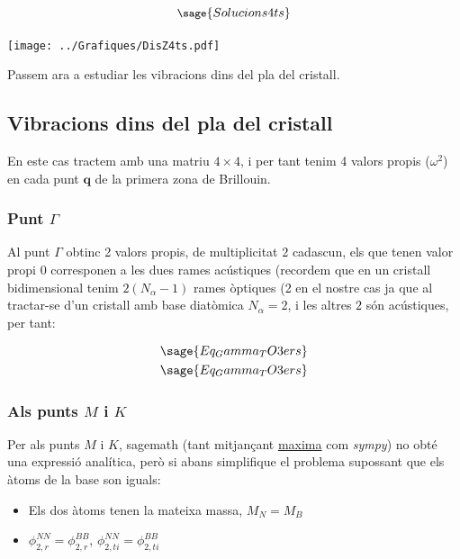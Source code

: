 \documentclass[12pt]{article} %
\let\vec\mathbf %
\begin{document}
{\begin{equation}\small{
 \sage{Solucions4ts}}
\end{equation}

\begin{center}
\texttt{[image: ../Grafiques/DisZ4ts.pdf]}
\end{center}

Passem ara a estudiar les vibracions dins del pla del cristall.

\subsection{Vibracions dins del pla del cristall}

En este cas tractem amb una matriu $4\times 4$, i per tant tenim 4 valors propis ($\omega^2$) en cada punt $\vec q$ de la primera zona de Brillouin.


\subsubsection{Punt $\Gamma$}

Al punt $\Gamma$ obtinc 2 valors propis, de multiplicitat $2$ cadascun, els que tenen valor propi $0$ corresponen a les dues rames acústiques (recordem que en un cristall bidimensional tenim $2(N_\alpha -1)$ rames òptiques (2 en el nostre cas ja que al tractar-se d'un cristall amb base diatòmica $N_\alpha=2$, i les altres $2$ són acústiques, per tant: 

\begin{equation}
 \begin{split}
\sage{Eq_Gamma_TO3ers}\\
\sage{Eq_Gamma_TO3ers}
 \end{split}
\end{equation}

\subsubsection{Als punts $M$ i $K$}

Per als punts $M$ i $K$, sagemath (tant mitjançant \href{https://maxima.sourceforge.io/}{maxima} com \textit{sympy}) no obté una expressió analítica, però si abans simplifique el problema supossant que els àtoms de la base son iguals:

\begin{itemize}

\item Els dos àtoms tenen la mateixa massa, $M_N=M_B$
\item  $\phi_{2,r}^{NN}=\phi_{2,r}^{BB}$, $\phi_{2,ti}^{NN}=\phi_{2,ti}^{BB}$ 
\end{itemize}

}
\end{document}
